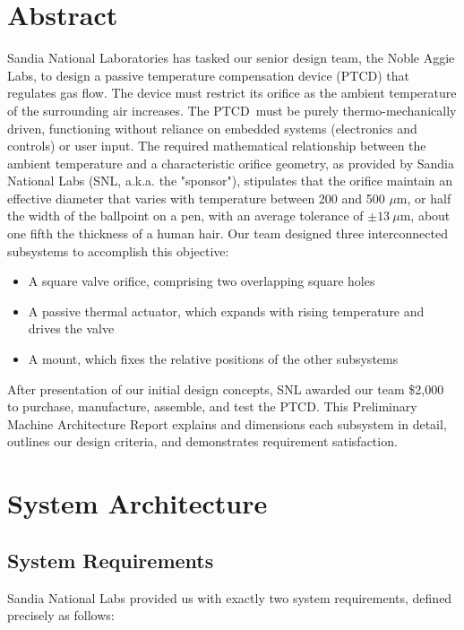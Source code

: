 \documentclass[12pt, letterpaper]{report}%
\newcounter{mycounter}           %
\newcounter{sub}[mycounter]      %
\newcommand{\teamname}{Noble Aggie Labs}
\newcommand{\device}{PTCD}
\begin{document}
\newpage
\tableofcontents
\listoffigures
\listoftables

\newpage  %

\chapter{Abstract}
\label{sec:abstract}


Sandia National Laboratories has tasked our senior design team, 
the \teamname, to design a passive temperature compensation device (\device) that regulates gas flow. 
The device must restrict its orifice as the ambient temperature of the surrounding air increases.
The \device\ must be purely thermo-mechanically driven, functioning without reliance on embedded systems (electronics and controls) or user input.
The required mathematical relationship between the ambient temperature and a characteristic orifice geometry, as provided by Sandia National Labs (SNL, a.k.a. the "sponsor"),
stipulates that the orifice maintain an effective diameter that varies with temperature between 200 and 500 $\mu$m, or half the width of the ballpoint on a pen,
with an average tolerance of $\pm 13\ \mu$m, about one fifth the thickness of a human hair.
Our team designed three interconnected subsystems to accomplish this objective:

\begin{itemize}
    \item A square valve orifice, comprising two overlapping square holes
    \item A passive thermal actuator, which expands with rising temperature and drives the valve
    \item A mount, which fixes the relative positions of the other subsystems
\end{itemize}

After presentation of our initial design concepts, SNL awarded our team \$2,000 to purchase, manufacture, assemble, and test the \device.
This Preliminary Machine Architecture Report explains and dimensions each subsystem in detail, outlines our design criteria, and demonstrates requirement satisfaction.

\chapter{System Architecture}
\label{sec:system_architecture}

    \section{System Requirements}
    \label{sec:initial_system_requirements}
        Sandia National Labs provided us with exactly two system requirements, 
        defined precisely as follows:
\end{document}
